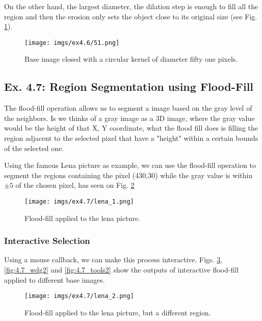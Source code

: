 \documentclass[journal]{IEEEtran}
\begin{document}
On the other hand, the largest diameter, the dilation step is enough to fill all the region and then the erosion only sets the object close to its original size (see Fig. \ref{fig:4.6_51}).

\begin{figure}[htp]
  \centering
  \texttt{[image: imgs/ex4.6/51.png]}
  \caption{Base image closed with a circular kernel of diameter fifty one pixels.}
  \label{fig:4.6_51}
\end{figure}
\FloatBarrier

\subsection{Ex. 4.7: Region Segmentation using Flood-Fill}

The flood-fill operation allows us to segment a image based on the gray level of the neighbors. Is we thinks of a gray image as a 3D image, where the gray value would be the height of that X, Y coordinate, what the flood fill does is filling the region adjacent to the selected pixel that have a "height" within a certain bounds of the selected one.

Using the famous Lena picture as example, we can use the flood-fill operation to segment the regions containing the pixel (430,30) while the gray value is within $\pm 5$ of the chosen pixel, has seen on Fig. \ref{fig:4.7_1}

\begin{figure}[htp]
  \centering
  \texttt{[image: imgs/ex4.7/lena\_1.png]}
  \caption{Flood-fill applied to the lena picture.}
  \label{fig:4.7_1}
\end{figure}
\FloatBarrier

\subsubsection{Interactive Selection}

Using a mouse callback, we can make this process interactive. Figs. \ref{fig:4.7_2}, \ref{fig:4.7_wdg2} and \ref{fig:4.7_tools2} show the outputs of interactive flood-fill applied to different base images.

\begin{figure}[htp]
  \centering
  \texttt{[image: imgs/ex4.7/lena\_2.png]}
  \caption{Flood-fill applied to the lena picture, but a different region.}
  \label{fig:4.7_2}
\end{figure}
\FloatBarrier
\end{document}
